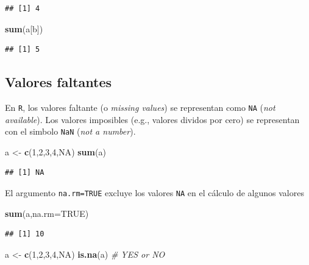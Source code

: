 \documentclass[]{article}
\newenvironment{Shaded}{\begin{snugshade}}{\end{snugshade}}
\newcommand{\KeywordTok}[1]{\textcolor[rgb]{0.13,0.29,0.53}{\textbf{{#1}}}}
\newcommand{\DataTypeTok}[1]{\textcolor[rgb]{0.13,0.29,0.53}{{#1}}}
\newcommand{\DecValTok}[1]{\textcolor[rgb]{0.00,0.00,0.81}{{#1}}}
\newcommand{\StringTok}[1]{\textcolor[rgb]{0.31,0.60,0.02}{{#1}}}
\newcommand{\CommentTok}[1]{\textcolor[rgb]{0.56,0.35,0.01}{\textit{{#1}}}}
\newcommand{\OtherTok}[1]{\textcolor[rgb]{0.56,0.35,0.01}{{#1}}}
\newcommand{\NormalTok}[1]{{#1}}
\numberwithin{equation}{section}
\begin{document}
\begin{verbatim}
## [1] 4
\end{verbatim}

\begin{Shaded}
\begin{Highlighting}[]
\KeywordTok{sum}\NormalTok{(a[b])}
\end{Highlighting}
\end{Shaded}

\begin{verbatim}
## [1] 5
\end{verbatim}

\subsection{Valores faltantes}\label{valores-faltantes}

En \texttt{R}, los valores faltante (o \emph{missing values}) se
representan como \texttt{NA} (\emph{not available}). Los valores
imposibles (e.g., valores dividos por cero) se representan con el
simbolo \texttt{NaN} (\emph{not a number}).

\begin{Shaded}
\begin{Highlighting}[]
\NormalTok{a <-}\StringTok{ }\KeywordTok{c}\NormalTok{(}\DecValTok{1}\NormalTok{,}\DecValTok{2}\NormalTok{,}\DecValTok{3}\NormalTok{,}\DecValTok{4}\NormalTok{,}\OtherTok{NA}\NormalTok{)}
\KeywordTok{sum}\NormalTok{(a)}
\end{Highlighting}
\end{Shaded}

\begin{verbatim}
## [1] NA
\end{verbatim}

El argumento \texttt{na.rm=TRUE} excluye los valores \texttt{NA} en el
cálculo de algunos valores

\begin{Shaded}
\begin{Highlighting}[]
\KeywordTok{sum}\NormalTok{(a,}\DataTypeTok{na.rm=}\OtherTok{TRUE}\NormalTok{)}
\end{Highlighting}
\end{Shaded}

\begin{verbatim}
## [1] 10
\end{verbatim}

\begin{Shaded}
\begin{Highlighting}[]
\NormalTok{a <-}\StringTok{ }\KeywordTok{c}\NormalTok{(}\DecValTok{1}\NormalTok{,}\DecValTok{2}\NormalTok{,}\DecValTok{3}\NormalTok{,}\DecValTok{4}\NormalTok{,}\OtherTok{NA}\NormalTok{)}
\KeywordTok{is.na}\NormalTok{(a) }\CommentTok{# YES or NO}
\end{Highlighting}
\end{Shaded}
\end{document}
